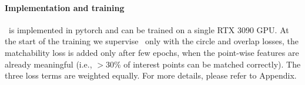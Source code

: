 

\paragraph{Implementation and training}
\acro\ is implemented in pytorch and can be trained on a single RTX 3090 GPU. At the start of the training we supervise \acro\ only with the circle and overlap losses, the matchability loss is added only after few epochs, when the point-wise features are already meaningful (i.e., $>$30\% of interest points can be matched correctly).
The three loss terms are weighted equally. For more details, please refer to Appendix.